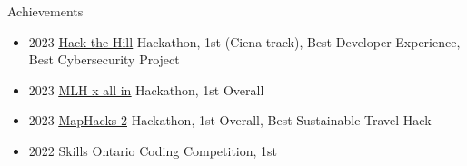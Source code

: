 \documentclass{resume}
\begin{document}
\begin{rSection}{Achievements}
	\begin{itemize}
		\itemsep -6pt {}
		\item	2023 \underline{\href{https://hack-the-hill.devpost.com}{Hack the Hill}} Hackathon, 1st (Ciena track), Best Developer Experience, Best Cybersecurity Project
		\item 2023 \underline{\href{https://all-in-hackathon.devpost.com/}{MLH x \textbraceleft all in\textbraceright}} Hackathon, 1st Overall
		\item 2023 \underline{\href{https://maphacks-2.devpost.com}{MapHacks 2}} Hackathon, 1st Overall, Best Sustainable Travel Hack
		\item	2022 Skills Ontario Coding Competition, 1st
	\end{itemize}
\end{rSection}
\end{document}
